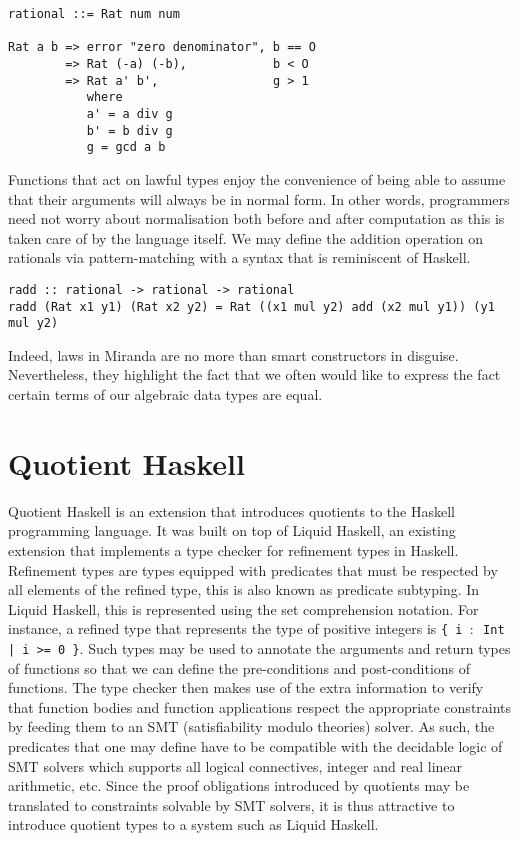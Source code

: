 \documentclass[12pt,twoside,maitrise]{dms}
\theoremstyle{definition}
\numberwithin{equation}{section}
\numberwithin{table}{chapter}
\numberwithin{figure}{chapter}
\newcommand\fn[1] {\texttt{#1}}
\begin{document}
\begin{verbatim}
rational ::= Rat num num

Rat a b => error "zero denominator", b == O
        => Rat (-a) (-b),            b < O
        => Rat a' b',                g > 1
           where
           a' = a div g
           b' = b div g
           g = gcd a b
\end{verbatim}

Functions that act on lawful types enjoy the convenience of being able to assume
that their arguments will always be in normal form. In other words, programmers
need not worry about normalisation both before and after computation as this is
taken care of by the language itself. We may define the addition operation on
rationals via pattern-matching with a syntax that is reminiscent of Haskell.

\begin{verbatim}
radd :: rational -> rational -> rational
radd (Rat x1 y1) (Rat x2 y2) = Rat ((x1 mul y2) add (x2 mul y1)) (y1 mul y2)
\end{verbatim}

Indeed, laws in Miranda are no more than smart constructors in disguise.
Nevertheless, they highlight the fact that we often would like to express the
fact certain terms of our algebraic data types are equal.

\section{Quotient Haskell}\label{sec:related-qit}

Quotient Haskell\cite{hewer2023quotient} is an extension that introduces
quotients to the Haskell programming language. It was built on top of Liquid
Haskell\cite{vazou2016liquid}, an existing extension that implements a type
checker for refinement types in Haskell. Refinement types are types equipped
with predicates that must be respected by all elements of the refined type, this
is also known as predicate subtyping. In Liquid Haskell, this is represented
using the set comprehension notation. For instance, a refined type that
represents the type of positive integers is \fn{\{ i $\colon$ Int | i >= 0 \}}.
Such types may be used to annotate the arguments and return types of functions
so that we can define the pre-conditions and post-conditions of functions. The
type checker then makes use of the extra information to verify that function
bodies and function applications respect the appropriate constraints by feeding
them to an SMT (satisfiability modulo theories) solver. As such, the predicates
that one may define have to be compatible with the decidable logic of SMT
solvers which supports all logical connectives, integer and real linear
arithmetic, etc. Since the proof obligations introduced by quotients may be
translated to constraints solvable by SMT solvers, it is thus attractive to
introduce quotient types to a system such as Liquid Haskell.
\end{document}
